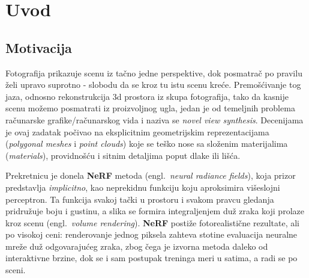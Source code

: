 \documentclass[12pt]{article}
\begin{document}
   \newpage
   
   \renewcommand{\contentsname}{Sadržaj}
   \tableofcontents
   \thispagestyle{empty} %

   \restoregeometry %
   \newpage

   \section{Uvod}

   \subsection{Motivacija}

   Fotografija prikazuje scenu iz tačno jedne perspektive, dok posmatrač
   po pravilu želi upravo suprotno - slobodu da se kroz tu istu scenu kreće.
   Premošćivanje tog jaza, odnosno rekonstrukcija 3d prostora
   iz skupa fotografija, tako da kasnije scenu možemo posmatrati iz proizvoljnog ugla, 
   jedan je od temeljnih problema računarske grafike/računarskog 
   vida i naziva se \textit{novel view synthesis}.
    Decenijama je ovaj zadatak počivao na
   eksplicitnim geometrijskim reprezentacijama (\textit{polygonal meshes} i
   \textit{point clouds}) koje se teško nose sa složenim materijalima (\textit{materials}),
   providnošću i sitnim detaljima poput dlake ili lišća.

   Prekretnicu je donela \textbf{NeRF} \cite{nerf} metoda (engl.\ \textit{neural
   radiance fields}), koja prizor predstavlja \emph{implicitno},
   kao neprekidnu funkciju koju aproksimira višeslojni perceptron. Ta funkcija
   svakoj tački u prostoru i svakom pravcu gledanja pridružuje boju i gustinu,
   a slika se formira integraljenjem duž zraka koji prolaze kroz scenu
   (engl.\ \textit{volume rendering}). \textbf{NeRF} postiže fotorealistične rezultate, ali po visokoj ceni:
   renderovanje jednog piksela zahteva stotine evaluacija neuralne mreže duž
   odgovarajućeg zraka, zbog čega je izvorna metoda daleko od interaktivne brzine,
   dok se i sam postupak treninga meri u satima, a radi se po sceni.
\end{document}
